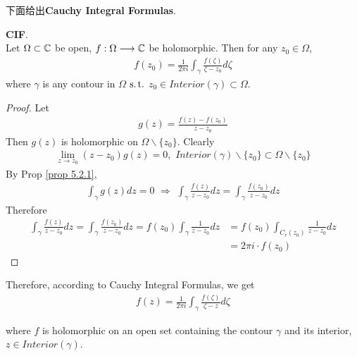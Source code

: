	\newpage
	下面给出\textbf{Cauchy Integral Formulas}.
	\begin{thm}\label{thm 5.2.1}
		\textbf{CIF}.\\
		Let $\Omega \subset \mathbb{C}$ be open, $f : \Omega \longrightarrow \mathbb{C}$ be holomorphic. Then for any $z_0 \in \Omega$,
		\begin{align}
			f(z_0) = \frac{1}{2 \pi i} \int_{\gamma}{\frac{f(\zeta)}{\zeta - z_0} d\zeta}
		\end{align}
		where $\gamma$ is any contour in $\Omega$ $\operatorname{s.t.}$ $z_0 \in Interior(\gamma) \subset \Omega$.
		
		\vspace{2em}
		\begin{proof}
			Let
			\begin{align}
				g(z) = \frac{f(z) - f(z_0)}{z - z_0}
			\end{align}
			Then $g(z)$ is holomorphic on $\Omega \backslash \{ z_0 \}$. Clearly
			\begin{align}
				\lim_{z \to z_0}{(z - z_0) g(z)} = 0 , \,\, Interior(\gamma) \backslash \{ z_0 \} \subset \Omega \backslash \{ z_0 \}
			\end{align}
			By Prop \ref{prop 5.2.1},
			\begin{align}
				\int_{\gamma}{g(z) dz} = 0 \,\, \Rightarrow \,\, \int_{\gamma}{\frac{f(z)}{z - z_0} dz} = \int_{\gamma}{\frac{f(z_0)}{z - z_0} dz}
			\end{align}
			Therefore
			\begin{align}
				\int_{\gamma}{\frac{f(z)}{z - z_0} dz} 
				= \int_{\gamma}{\frac{f(z_0)}{z - z_0} dz} 
				= f(z_0) \int_{\gamma}{\frac{1}{z - z_0} dz} 
				&= f(z_0) \int_{C_{r}(z_0)}{\frac{1}{z - z_0} dz} \\
				&= 2 \pi i \cdot f(z_0)
			\end{align}
		\end{proof}
	\end{thm}

	\vspace{2em}
	Therefore, according to Cauchy Integral Formulas, we get
	\begin{align}
		f(z) = \frac{1}{2 \pi i} \int_{\gamma}{\frac{f(\zeta)}{\zeta - z} d\zeta} 
	\end{align}
	\begin{center}
		where $f$ is holomorphic on an open set containing the contour $\gamma$ and its interior, $z \in Interior(\gamma)$.
	\end{center}

	\newpage
